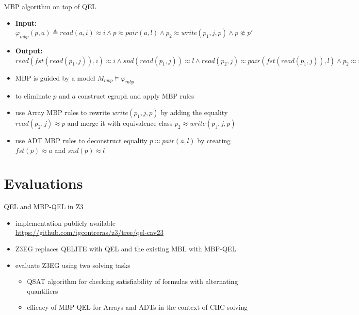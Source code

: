 \documentclass{beamer}
\begin{document}
\begin{frame}{MBP algorithm on top of QEL}
    \begin{itemize}
        \item \textbf{Input:} 
        $\varphi_{mbp}(p,a) \triangleq read(a,i) \approx i \land p \approx pair(a,l) \land p_2 \approx write(p_1, j, p) \land p \not\approx p'$
        \item  \textbf{Output:} $read(fst(read(p_1,j)),i) \approx i \land snd(read(p_1,j)) \approx l \land read(p_2, j) \approx pair(fst(read(p_1,j)),l) \land p_2 \approx write(p_1, j, read(p_2, j)) \land read(p_2,j) \not\approx p'$
        \pause
        \item MBP is guided by a model $M_{mbp} \vDash \varphi_{mbp}$
        \pause
        \item to eliminate $p$ and $a$ construct egraph and apply MBP rules
        \pause
        \item use Array MBP rules to rewrite $write(p_1,j,p)$ by adding the equality $read(p_2, j) \approx p$ and merge it with equivalence class $p_2 \approx write(p_1,j,p)$
        \pause
        \item use ADT MBP rules to deconstruct equality $p \approx pair(a,l)$ by creating $fst(p) \approx a$ and $snd(p) \approx l$
    \end{itemize}
\end{frame}


\section{Evaluations}

\begin{frame}{QEL and MBP-QEL in Z3}
\begin{itemize}
  \item implementation publicly available \url{https://github.com/igcontreras/z3/tree/qel-cav23}
  \item Z3EG replaces QELITE with QEL and the existing MBL with MBP-QEL
  \pause
  \item evaluate Z3EG using two solving tasks
  \begin{itemize}
      \item QSAT algorithm for checking satisfiability of formulas with alternating quantifiers
      \item efficacy of MBP-QEL for Arrays and ADTs in the context of CHC-solving
  \end{itemize}
\end{itemize}
\end{frame}
\end{document}
